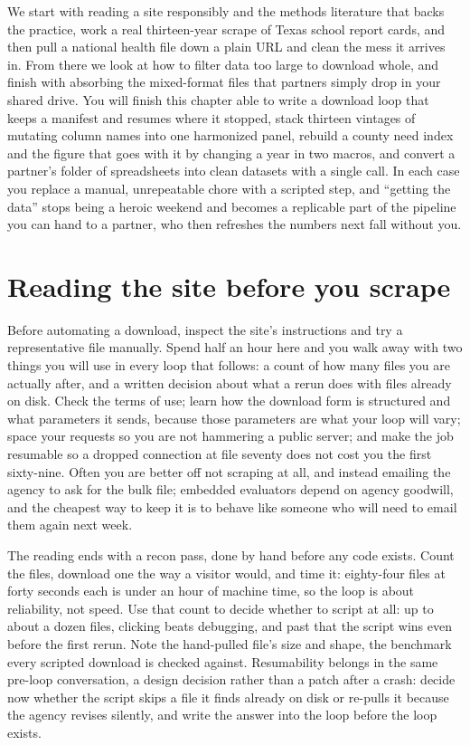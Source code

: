 \documentclass[
    a4paper,
    fontsize=10pt,
    twoside=true,
    numbers=noenddot,
]{kaobook}
\begin{document}
We start with reading a site responsibly and the methods literature that backs the practice, work a real thirteen-year scrape of Texas school report cards, and then pull a national health file down a plain URL and clean the mess it arrives in. From there we look at how to filter data too large to download whole, and finish with absorbing the mixed-format files that partners simply drop in your shared drive. You will finish this chapter able to write a download loop that keeps a manifest and resumes where it stopped, stack thirteen vintages of mutating column names into one harmonized panel, rebuild a county need index and the figure that goes with it by changing a year in two macros, and convert a partner's folder of spreadsheets into clean datasets with a single call. In each case you replace a manual, unrepeatable chore with a scripted step, and \enquote{getting the data} stops being a heroic weekend and becomes a replicable part of the pipeline you can hand to a partner, who then refreshes the numbers next fall without you.

\section{Reading the site before you scrape}
Before automating a download, inspect the site's instructions and try a representative file manually. Spend half an hour here and you walk away with two things you will use in every loop that follows: a count of how many files you are actually after, and a written decision about what a rerun does with files already on disk. Check the terms of use; learn how the download form is structured and what parameters it sends, because those parameters are what your loop will vary; space your requests so you are not hammering a public server; and make the job resumable so a dropped connection at file seventy does not cost you the first sixty-nine. Often you are better off not scraping at all, and instead emailing the agency to ask for the bulk file; embedded evaluators depend on agency goodwill, and the cheapest way to keep it is to behave like someone who will need to email them again next week.

The reading ends with a recon pass, done by hand before any code exists. Count the files, download one the way a visitor would, and time it: eighty-four files at forty seconds each is under an hour of machine time, so the loop is about reliability, not speed. Use that count to decide whether to script at all: up to about a dozen files, clicking beats debugging, and past that the script wins even before the first rerun. Note the hand-pulled file's size and shape, the benchmark every scripted download is checked against. Resumability belongs in the same pre-loop conversation, a design decision rather than a patch after a crash: decide now whether the script skips a file it finds already on disk or re-pulls it because the agency revises silently, and write the answer into the loop before the loop exists.
\end{document}

